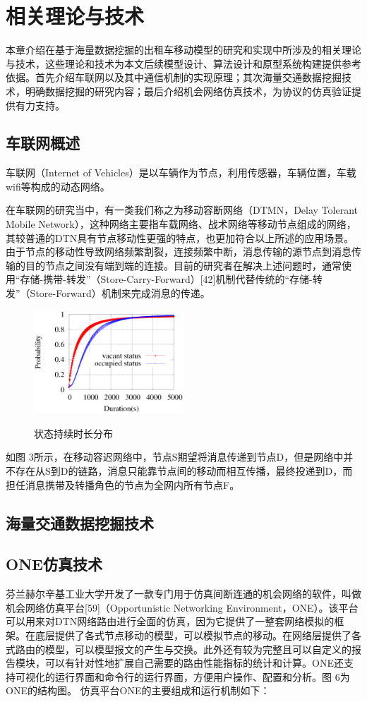 \chapter{相关理论与技术}
本章介绍在基于海量数据挖掘的出租车移动模型的研究和实现中所涉及的相关理论与技术，这些理论和技术为本文后续模型设计、算法设计和原型系统构建提供参考依据。首先介绍车联网以及其中通信机制的实现原理；其次海量交通数据挖掘技术，明确数据挖掘的研究内容；最后介绍机会网络仿真技术，为协议的仿真验证提供有力支持。


\section{车联网概述}
车联网（Internet of Vehicles）是以车辆作为节点，利用传感器，车辆位置，车载wifi等构成的动态网络。

在车联网的研究当中，有一类我们称之为移动容断网络（DTMN，Delay Tolerant Mobile Network），这种网络主要指车载网络、战术网络等移动节点组成的网络，其较普通的DTN具有节点移动性更强的特点，也更加符合以上所述的应用场景。由于节点的移动性导致网络频繁割裂，连接频繁中断，消息传输的源节点到消息传输的目的节点之间没有端到端的连接。目前的研究者在解决上述问题时，通常使用“存储-携带-转发”（Store-Carry-Forward）[42]机制代替传统的“存储-转发”（Store-Forward）机制来完成消息的传递。

\begin{figure}
\centering
\includegraphics[width=0.5\textwidth]{figures/assumption/durationdis.eps}\\
\caption{状态持续时长分布}\label{figure_vehicles_network}
\end{figure}

如图 3所示，在移动容迟网络中，节点S期望将消息传递到节点D，但是网络中并不存在从S到D的链路，消息只能靠节点间的移动而相互传播，最终投递到D，而担任消息携带及转播角色的节点为全网内所有节点F。

\section{海量交通数据挖掘技术}
\section{ONE仿真技术}
芬兰赫尔辛基工业大学开发了一款专门用于仿真间断连通的机会网络的软件，叫做 机会网络仿真平台[59]（Opportunistic Networking Environment，ONE）。该平台可以用来对DTN网络路由进行全面的仿真，因为它提供了一整套网络模拟的框架。在底层提供了各式节点移动的模型，可以模拟节点的移动。在网络层提供了各式路由的模型，可以模型报文的产生与交换。此外还有较为完整且可以自定义的报告模块，可以有针对性地扩展自己需要的路由性能指标的统计和计算。ONE还支持可视化的运行界面和命令行的运行界面，方便用户操作、配置和分析。图 6为ONE的结构图。
仿真平台ONE的主要组成和运行机制如下：

